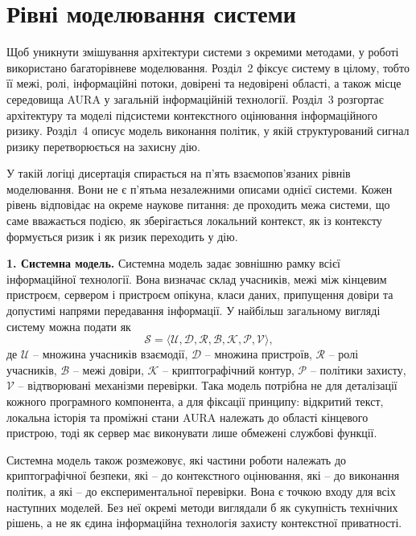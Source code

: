 \section{Рівні моделювання системи}
\label{sec:modeling-levels}

Щоб уникнути змішування архітектури системи з окремими методами, у роботі використано багаторівневе моделювання. Розділ~2 фіксує систему в цілому, тобто її межі, ролі, інформаційні потоки, довірені та недовірені області, а також місце середовища AURA у загальній інформаційній технології. Розділ~3 розгортає архітектуру та моделі підсистеми контекстного оцінювання інформаційного ризику. Розділ~4 описує модель виконання політик, у якій структурований сигнал ризику перетворюється на захисну дію.

У такій логіці дисертація спирається на п'ять взаємопов'язаних рівнів моделювання. Вони не є п'ятьма незалежними описами однієї системи. Кожен рівень відповідає на окреме наукове питання: де проходить межа системи, що саме вважається подією, як зберігається локальний контекст, як із контексту формується ризик і як ризик переходить у дію.

\textbf{1. Системна модель.}
Системна модель задає зовнішню рамку всієї інформаційної технології. Вона визначає склад учасників, межі між кінцевим пристроєм, сервером і пристроєм опікуна, класи даних, припущення довіри та допустимі напрями передавання інформації. У найбільш загальному вигляді систему можна подати як
\begin{equation}
  \mathcal{S} =
  \langle \mathcal{U}, \mathcal{D}, \mathcal{R}, \mathcal{B}, \mathcal{K}, \mathcal{P}, \mathcal{V} \rangle,
  \label{eq:system-model}
\end{equation}
де \(\mathcal{U}\) -- множина учасників взаємодії, \(\mathcal{D}\) -- множина пристроїв, \(\mathcal{R}\) -- ролі учасників, \(\mathcal{B}\) -- межі довіри, \(\mathcal{K}\) -- криптографічний контур, \(\mathcal{P}\) -- політики захисту, \(\mathcal{V}\) -- відтворювані механізми перевірки. Така модель потрібна не для деталізації кожного програмного компонента, а для фіксації принципу: відкритий текст, локальна історія та проміжні стани AURA належать до області кінцевого пристрою, тоді як сервер має виконувати лише обмежені службові функції.

Системна модель також розмежовує, які частини роботи належать до криптографічної безпеки, які -- до контекстного оцінювання, які -- до виконання політик, а які -- до експериментальної перевірки. Вона є точкою входу для всіх наступних моделей. Без неї окремі методи виглядали б як сукупність технічних рішень, а не як єдина інформаційна технологія захисту контекстної приватності.

